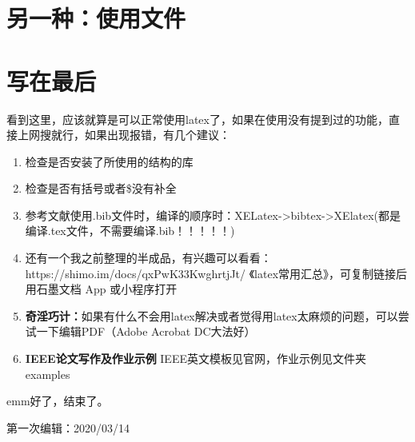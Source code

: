 \documentclass[UTF8]{ctexart}
\begin{document}
\section{另一种：使用文件}

\section{写在最后}
看到这里，应该就算是可以正常使用latex了，如果在使用没有提到过的功能，直接上网搜就行，如果出现报错，有几个建议：
\begin{enumerate}
\item 检查是否安装了所使用的结构的库
\item 检查是否有括号或者\$没有补全
\item 参考文献使用.bib文件时，编译的顺序时：XELatex->bibtex->XElatex(都是编译.tex文件，不需要编译.bib！！！！！)
\item 还有一个我之前整理的半成品，有兴趣可以看看：https://shimo.im/docs/qxPwK33KwghrtjJt/ 
《latex常用汇总》，可复制链接后用石墨文档 App 或小程序打开
\item \textbf{奇淫巧计：}如果有什么不会用latex解决或者觉得用latex太麻烦的问题，可以尝试一下编辑PDF（Adobe Acrobat DC大法好）
\item \textbf{IEEE论文写作及作业示例} IEEE英文模板见官网，作业示例见文件夹examples
\end{enumerate}
emm好了，结束了。

第一次编辑：2020/03/14
\end{document}
